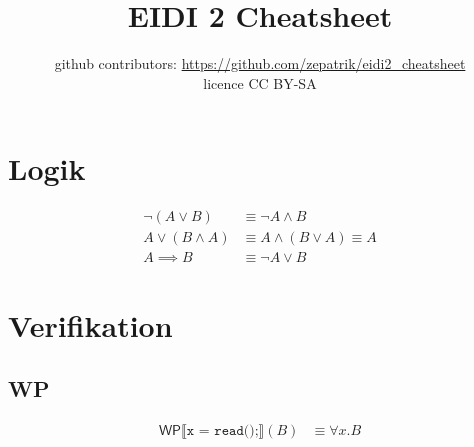 \documentclass[a4paper,7pt,landscape]{article}
\title{EIDI 2 Cheatsheet}
\author{github contributors: \url{https://github.com/zepatrik/eidi2_cheatsheet} \\
licence CC BY-SA
}
\newcommand{\semT}[1]{\llbracket{}\texttt{#1}\rrbracket{}}
\newcommand{\WP}[1]{\textsf{WP}\semT{#1}}
\begin{document}
  \maketitle
  \newpage
  
  \begin{multicols*}{4}
    \section{Logik}
    \begin{align*}
      \neg (A \lor B) &\equiv \neg A \land B \\
      A \lor (B \land A) &\equiv A \land (B \lor A) \equiv A \\
      A \implies B &\equiv \neg A \lor B
    \end{align*}
    
    \section{Verifikation}
    \subsection{WP}
    \begin{align*}
      \WP{x = read();}(B) &\equiv \forall x.B
    \end{align*}
    
  \end{multicols*}
\end{document}
